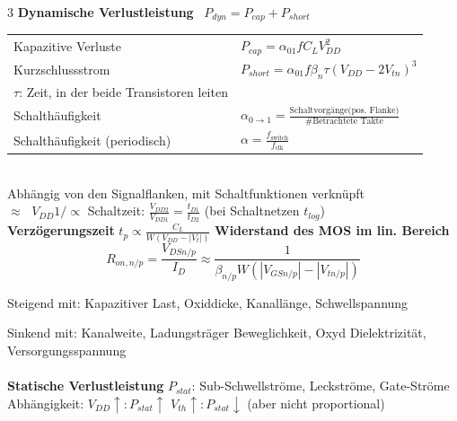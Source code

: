 \documentclass[6pt,a4paper]{scrartcl}
\renewcommand{\emph}[1]{\textsf{\textbf{#1}}}
\begin{document}
\begin{multicols*}{3}
	\everymath{\displaystyle}
	\emph{Dynamische Verlustleistung} \qquad \ $P_{dyn} = P_{cap} + P_{short}$\\
	\begin{tabular}{ll}
		\quad Kapazitive Verluste \qquad \ \quad \  & $P_{cap} = \alpha_{01} f C_L V_{DD}^2$                                                              \\
		\quad Kurzschlussstrom                      & $P_{short} = \alpha_{01} f \beta_n \tau (V_{DD} - 2V_{tn})^3$                                       \\
		\qquad $\tau$: Zeit, in der beide Transistoren leiten                                                                                             \\[0.8em]
		\quad Schalthäufigkeit                      & $\alpha_{0 \rightarrow 1} = \frac{\text{Schaltvorgänge(pos. Flanke)}}{\text{\# Betrachtete Takte}}$ \\
		\quad Schalthäufigkeit (periodisch)         & $\alpha = \frac{f_\text{switch}}{f_\text{clk}}$                                                     \\
	\end{tabular}\\
	Abhängig von den Signalflanken, mit Schaltfunktionen verknüpft\\
	$\approx \;$ $V_{DD} 1/\propto $ Schaltzeit: $\frac{V_{DD2}}{V_{DD1}} = \frac{t_{D1}}{t_{D2}}$ (bei Schaltnetzen $t_{log}$)\\
	\textbf{Verzögerungszeit} $t_p\propto \frac{C_L}{W(V_{DD}-|V_t|)}$
	\everymath{\textstyle}
	\textbf{Widerstand des MOS im lin. Bereich}\\
	\[
		R_{on,n/p}=\frac{V_{DSn/p}}{I_D}\approx \frac{1}{\beta_{n/p} W(|V_{GSn/p}| - |V_{tn/p}|)}
	\]

	Steigend mit: Kapazitiver Last, Oxiddicke, Kanallänge, Schwellspannung

	Sinkend mit: Kanalweite, Ladungsträger Beweglichkeit, Oxyd Dielektrizität, Versorgungsspannung \\ \\
	\emph{Statische Verlustleistung} $P_{stat}$: Sub-Schwellströme, Leckströme, Gate-Ströme
	Abhängigkeit: $V_{DD}\uparrow:P_{stat}\uparrow$ \qquad $V_{th}\uparrow:P_{stat}\downarrow$ \quad (aber nicht proportional)


\end{multicols*}
\end{document}

